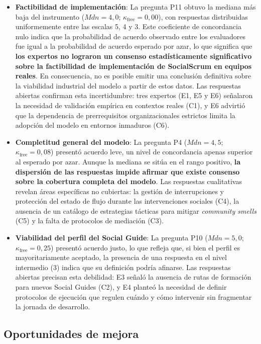 \begin{itemize}
   \item \textbf{Factibilidad de implementación}: La pregunta P11 obtuvo la mediana más baja del instrumento ($Mdn = 4{,}0$; $\kappa_{\text{free}} = 0{,}00$), con respuestas distribuidas uniformemente entre las escalas 5, 4 y 3. Este coeficiente de concordancia nulo indica que la probabilidad de acuerdo observado entre los evaluadores fue igual a la probabilidad de acuerdo esperado por azar, lo que significa que \textbf{los expertos no lograron un consenso estadísticamente significativo sobre la factibilidad de implementación de SocialScrum en equipos reales}. En consecuencia, no es posible emitir una conclusión definitiva sobre la viabilidad industrial del modelo a partir de estos datos. Las respuestas abiertas confirman esta incertidumbre: tres expertos (E1, E5 y E6) señalaron la necesidad de validación empírica en contextos reales (C1), y E6 advirtió que la dependencia de prerrequisitos organizacionales estrictos limita la adopción del modelo en entornos inmaduros (C6).
   \item \textbf{Completitud general del modelo}: La pregunta P4 ($Mdn = 4{,}5$; $\kappa_{\text{free}} = 0{,}08$) presentó acuerdo leve, un nivel de concordancia apenas superior al esperado por azar. Aunque la mediana se sitúa en el rango positivo, \textbf{la dispersión de las respuestas impide afirmar que existe consenso sobre la cobertura completa del modelo}. Las respuestas cualitativas revelan áreas específicas no cubiertas: la gestión de interrupciones y protección del estado de flujo durante las intervenciones sociales (C4), la ausencia de un catálogo de estrategias tácticas para mitigar \textit{community smells} (C5) y la falta de protocolos de mediación (C3).
   \item \textbf{Viabilidad del perfil del Social Guide}: La pregunta P10 ($Mdn = 5{,}0$; $\kappa_{\text{free}} = 0{,}25$) presentó acuerdo justo, lo que refleja que, si bien el perfil es mayoritariamente aceptado, la presencia de una respuesta en el nivel intermedio (3) indica que su definición podría afinarse. Las respuestas abiertas precisan esta debilidad: E3 señaló la ausencia de rutas de formación para nuevos Social Guides (C2), y E4 planteó la necesidad de definir protocolos de ejecución que regulen cuándo y cómo intervenir sin fragmentar la jornada de desarrollo.
\end{itemize}

\subsection{Oportunidades de mejora}

